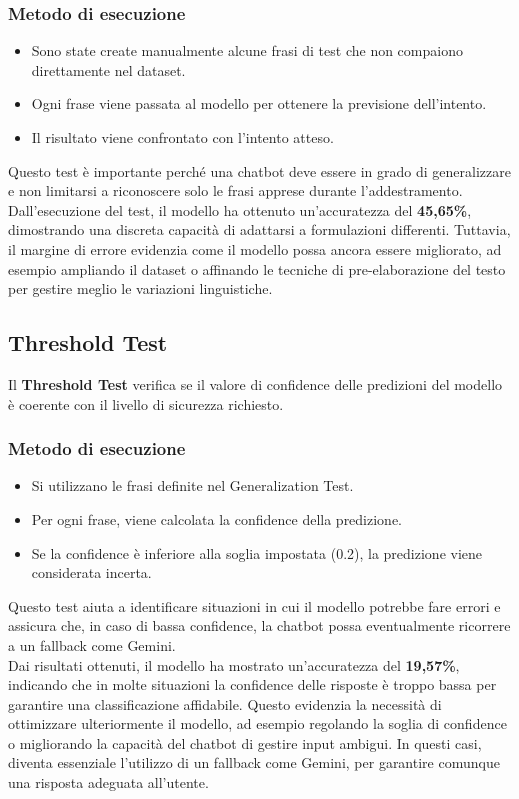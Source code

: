 \documentclass[12pt, letterpaper]{article}
\begin{document}
\subsubsection{Metodo di esecuzione}
\begin{itemize}
	\item Sono state create manualmente alcune frasi di test che non compaiono direttamente nel dataset.
	\item Ogni frase viene passata al modello per ottenere la previsione dell'intento.
	\item Il risultato viene confrontato con l'intento atteso.
\end{itemize}
Questo test è importante perché una chatbot deve essere in grado di generalizzare e non limitarsi a riconoscere solo le frasi apprese durante l’addestramento.\\
\newline
Dall’esecuzione del test, il modello ha ottenuto un'accuratezza del \textbf{45,65\%}, dimostrando una discreta capacità di adattarsi a formulazioni differenti. Tuttavia, il margine di errore evidenzia come il modello possa ancora essere migliorato, ad esempio ampliando il dataset o affinando le tecniche di pre-elaborazione del testo per gestire meglio le variazioni linguistiche.

\subsection{Threshold Test}

Il \textbf{Threshold Test} verifica se il valore di confidence delle predizioni del modello è coerente con il livello di sicurezza richiesto.

\subsubsection{Metodo di esecuzione}
\begin{itemize}
	\item Si utilizzano le frasi definite nel Generalization Test.
	\item Per ogni frase, viene calcolata la confidence della predizione.
	\item Se la confidence è inferiore alla soglia impostata (0.2), la predizione viene considerata incerta.
\end{itemize}
Questo test aiuta a identificare situazioni in cui il modello potrebbe fare errori e assicura che, in caso di bassa confidence, la chatbot possa eventualmente ricorrere a un fallback come Gemini.\\
\newline
Dai risultati ottenuti, il modello ha mostrato un'accuratezza del \textbf{19,57\%}, indicando che in molte situazioni la confidence delle risposte è troppo bassa per garantire una classificazione affidabile. Questo evidenzia la necessità di ottimizzare ulteriormente il modello, ad esempio regolando la soglia di confidence o migliorando la capacità del chatbot di gestire input ambigui. In questi casi, diventa essenziale l’utilizzo di un fallback come Gemini, per garantire comunque una risposta adeguata all’utente.
\end{document}
